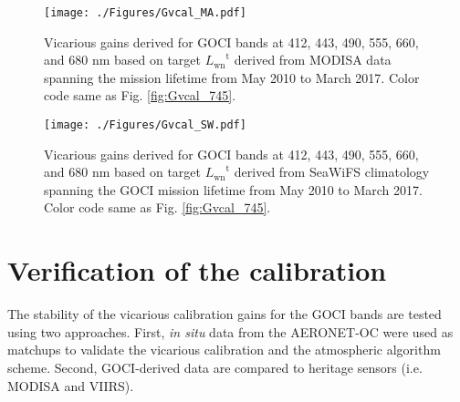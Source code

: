 \documentclass[]{interact}
\theoremstyle{plain}%
\theoremstyle{definition}
\theoremstyle{remark}
\begin{document}
\begin{figure}[H]
  \centering
  \texttt{[image: ./Figures/Gvcal\_MA.pdf]}
    \caption{Vicarious gains derived for GOCI bands at 412, 443, 490, 555, 660, and 680 nm based on target ${L_\text{wn}}^\text{t}$ derived from MODISA data spanning the mission lifetime from May 2010 to March 2017. Color code same as Fig. \ref{fig:Gvcal_745}.  \label{fig:Gvcal_MA}} 
\end{figure}
\begin{figure}[H]
  \centering
  \texttt{[image: ./Figures/Gvcal\_SW.pdf]}
    \caption{Vicarious gains derived for GOCI bands at 412, 443, 490, 555, 660, and 680 nm based on target ${L_\text{wn}}^\text{t}$ derived from SeaWiFS climatology spanning the GOCI mission lifetime from May 2010 to March 2017.  Color code same as Fig. \ref{fig:Gvcal_745}.  \label{fig:Gvcal_SW}} 
\end{figure}








\section{Verification of the calibration}
The stability of the vicarious calibration gains for the GOCI bands are tested using two approaches. First, {\it in situ} data from the AERONET-OC were used as matchups to validate the vicarious calibration and the atmospheric algorithm scheme. Second, GOCI-derived data are compared to heritage sensors (i.e. MODISA and VIIRS). 
\end{document}

